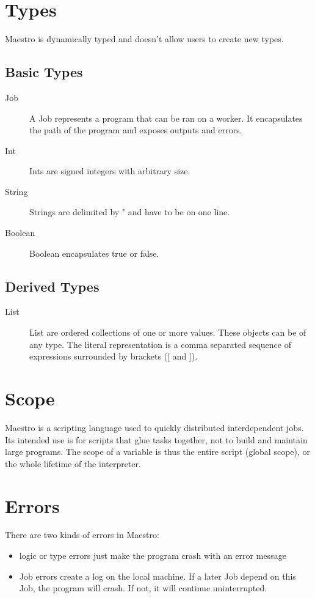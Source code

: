 \section{Types}
Maestro is dynamically typed and doesn't allow users to create new types.
\subsection{Basic Types}
\begin{description}
  \item[Job] A Job represents a program that can be ran on a worker. It encapsulates
    the path of the program and exposes outputs and errors.
  \item[Int] Ints are signed integers with arbitrary size.
  \item[String] Strings are delimited by " and have to be on one line.
  \item[Boolean] Boolean encapsulates true or false.
\end{description}

\subsection{Derived Types}
\begin{description}
  \item[List] List are ordered collections of one or more values. These
    objects can be of any type. The literal representation is a
    comma separated sequence of expressions surrounded by brackets ([ and ]).
\end{description}

\section{Scope}
Maestro is a scripting language used to quickly distributed interdependent jobs.
Its intended use is for scripts that glue tasks together, not to build and
maintain large programs. The scope of a variable is thus the entire script
(global scope), or the whole lifetime of the interpreter.

\section{Errors}
There are two kinds of errors in Maestro:
\begin{itemize}
  \item logic or type errors just make the program crash with an error
  message
  \item Job errors create a log on the local machine. If a later Job depend
  on this Job, the program will crash. If not, it will continue uninterrupted.
\end{itemize}

